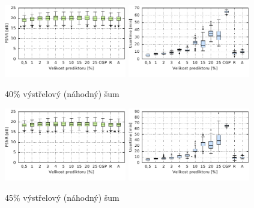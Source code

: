 \begin{figure}[H]
    \centering
    \includegraphics[width=0.475\textwidth]{fig/plot/compare/impulse40-100kg-psnrtest.pdf}
    \hskip0.5cm
    \includegraphics[width=0.475\textwidth]{fig/plot/compare/impulse40-100kg-usertime.pdf}
    \caption{40\% výstřelový (náhodný) šum}
\end{figure}

\begin{figure}[H]
    \centering
    \includegraphics[width=0.475\textwidth]{fig/plot/compare/impulse45-100kg-psnrtest.pdf}
    \hskip0.5cm
    \includegraphics[width=0.475\textwidth]{fig/plot/compare/impulse45-100kg-usertime.pdf}
    \caption{45\% výstřelový (náhodný) šum}
\end{figure}

